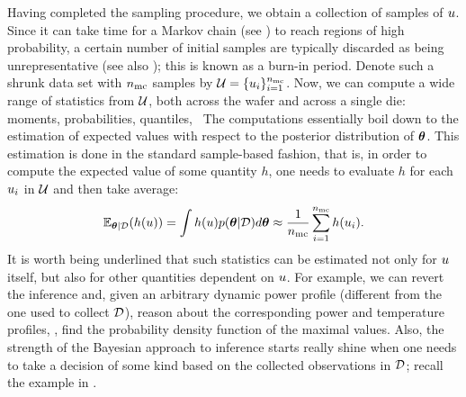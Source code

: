 Having completed the sampling procedure, we obtain a collection of samples of $u$. Since it can take time for a Markov chain (see ) to reach regions of high probability, a certain number of initial samples are typically discarded as being unrepresentative (see also ); this is known as a burn-in period. Denote such a shrunk data set with ${n_\text{mc}}$ samples by $\mathcal{U} = \{ u_i \}_{i = 1}^{n_\text{mc}}$. Now, we can compute a wide range of statistics from $\mathcal{U}$, both across the wafer and across a single die: moments, probabilities, quantiles, \etc\ The computations essentially boil down to the estimation of expected values with respect to the posterior distribution of ${\boldsymbol\theta}$. This estimation is done in the standard sample-based fashion, that is, in order to compute the expected value of some quantity $h$, one needs to evaluate $h$ for each $u_i$ in $\mathcal{U}$ and then take average:
\[
  \E_{\vparam | \Data}(h(\u)) = \int h(\u) \f{\vparam | \Data} d\vparam \approx \frac{1}{\nsamples} \sum_{i = 1}^\nsamples h(\u_i).
\]
It is worth being underlined that such statistics can be estimated not only for $u$ itself, but also for other quantities dependent on $u$. For example, we can revert the inference and, given an arbitrary dynamic power profile (different from the one used to collect $\mathcal{D}$), reason about the corresponding power and temperature profiles, \eg, find the probability density function of the maximal values. Also, the strength of the Bayesian approach to inference starts really shine when one needs to take a decision of some kind based on the collected observations in $\mathcal{D}$; recall the example in .
